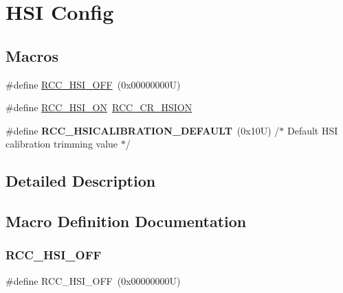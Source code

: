 \hypertarget{group___r_c_c___h_s_i___config}{}\section{H\+SI Config}
\label{group___r_c_c___h_s_i___config}
\subsection*{Macros}
\begin{DoxyCompactItemize}
\item 
\#define \hyperlink{group___r_c_c___h_s_i___config_ga1b34d37d3b51afec0758b3ddc7a7e665}{R\+C\+C\+\_\+\+H\+S\+I\+\_\+\+O\+FF}~(0x00000000\+U)
\item 
\#define \hyperlink{group___r_c_c___h_s_i___config_ga0bf09ef9e46d5da25cced7b3122f92f5}{R\+C\+C\+\_\+\+H\+S\+I\+\_\+\+ON}~\hyperlink{group___peripheral___registers___bits___definition_gaf4fcacf94a97f7d49a70e089b39cf474}{R\+C\+C\+\_\+\+C\+R\+\_\+\+H\+S\+I\+ON}
\item 
\mbox{\label{group___r_c_c___h_s_i___config_ga03cf582e263fb7e31a7783d8adabd7a0}} 
\#define {\bfseries R\+C\+C\+\_\+\+H\+S\+I\+C\+A\+L\+I\+B\+R\+A\+T\+I\+O\+N\+\_\+\+D\+E\+F\+A\+U\+LT}~(0x10\+U)         /$\ast$ Default H\+S\+I calibration trimming value $\ast$/
\end{DoxyCompactItemize}


\subsection{Detailed Description}


\subsection{Macro Definition Documentation}
\mbox{\label{group___r_c_c___h_s_i___config_ga1b34d37d3b51afec0758b3ddc7a7e665}} 
\subsubsection{\texorpdfstring{R\+C\+C\+\_\+\+H\+S\+I\+\_\+\+O\+FF}{RCC\_HSI\_OFF}}
{\footnotesize\ttfamily \#define R\+C\+C\+\_\+\+H\+S\+I\+\_\+\+O\+FF~(0x00000000\+U)}

